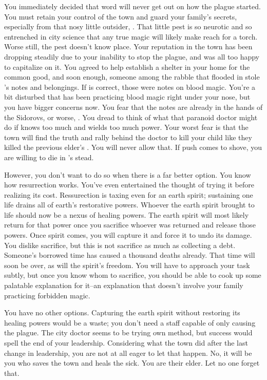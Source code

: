 \documentclass[char]{Pestilence}
\begin{document}
You immediately decided that word will never get out on how the plague started. You must retain your control of the town and guard your family's secrets, especially from that nosy little outsider, \cOutsider{}. That little pest is so neurotic and so entrenched in \cOutsider{\their} city science that any true magic will likely make \cOutsider{\them} reach for a torch. Worse still, the pest doesn't know \cOutsider{\their} place. Your reputation in the town has been dropping steadily due to your inability to stop the plague, and \cOutsider{} was all too happy to capitalize on it. You agreed to help \cOutsider{\them} establish a shelter in your home for the common good, and soon enough, someone among the rabble that flooded in stole \cRebel{}'s notes and belongings. If \cApprentice{} is correct, those were notes on blood magic. You're a bit disturbed that \cRebel{} has been practicing blood magic right under your nose, but you have bigger concerns now. You fear that the notes are already in the hands of the Sidorovs, or worse, \cOutsider{}. You dread to think of what that paranoid doctor might do if \cOutsider{\they} knows too much and wields too much power. Your worst fear is that the town will find the truth and rally behind the doctor to kill your child like they killed the previous elder's \cPlaguebearer{\offspring}. You will never allow that. If push comes to shove, you are willing to die in \cRebel{}'s stead. 

However, you don't want to do so when there is a far better option. You know how resurrection works. You've even entertained the thought of trying it before realizing its cost. Ressurection is taxing even for an earth spirit; sustaining one life drains all of earth's restorative powers. Whoever the earth spirit brought to life should now be a nexus of healing powers. The earth spirit will most likely return for that power once you sacrifice whoever was returned and release those powers. Once spirit comes, you will capture it and force it to undo its damage. You dislike sacrifice, but this is not sacrifice as much as collecting a debt. Someone's borrowed time has caused a thousand deaths already. That time will soon be over, as will the spirit's freedom. You will have to approach your task subtly, but once you know whom to sacrifice, you should be able to cook up some palatable explanation for it--an explanation that doesn't involve your family practicing forbidden magic.

You have no other options. Capturing the earth spirit without restoring its healing powers would be a waste; you don't need a staff capable of only causing the plague. The city doctor seems to be trying \cOutsider{\their} own method, but \cOutsider{\their} success would spell the end of your leadership. Considering what the town did after the last change in leadership, you are not at all eager to let that happen. No, it will be you who saves the town and heals the sick. You are their elder. Let no one forget that.
\end{document}
